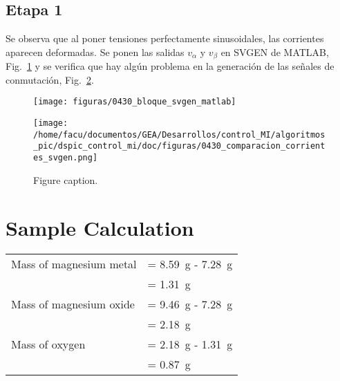 \documentclass{article}
\begin{document}
	
	
	\subsection{Etapa 1}
	
		Se observa que al poner tensiones perfectamente sinusoidales, las corrientes aparecen deformadas. Se ponen las salidas $v_\alpha$ y $v_\beta$ en SVGEN de MATLAB, Fig.~\ref{fig:bloque_svgen_matlab} y se verifica que hay algún problema en la generación de las señales de conmutación, Fig.~\ref{fig:comparacion_corrientes}.
	
	\begin{figure}
		\centering
		\texttt{[image: figuras/0430\_bloque\_svgen\_matlab]}
		\caption[Ejemplo de bloque SVGEN de MATLAB.]{}
		\label{fig:bloque_svgen_matlab}
	\end{figure}
	
	
	
	\begin{figure}[h]
	\begin{center}
		\texttt{[image: /home/facu/documentos/GEA/Desarrollos/control\_MI/algoritmos\_pic/dspic\_control\_mi/doc/figuras/0430\_comparacion\_corrientes\_svgen.png]} %
		\caption{Figure caption.}
		\label{fig:comparacion_corrientes}
	\end{center}
	\end{figure}
	
	
	\section{Sample Calculation}
	
	\begin{tabular}{ll}
		Mass of magnesium metal & = \SI{8.59}{\gram} - \SI{7.28}{\gram}\\
		& = \SI{1.31}{\gram}\\
		Mass of magnesium oxide & = \SI{9.46}{\gram} - \SI{7.28}{\gram}\\
		& = \SI{2.18}{\gram}\\
		Mass of oxygen & = \SI{2.18}{\gram} - \SI{1.31}{\gram}\\
		& = \SI{0.87}{\gram}
	\end{tabular}
	
\end{document}
